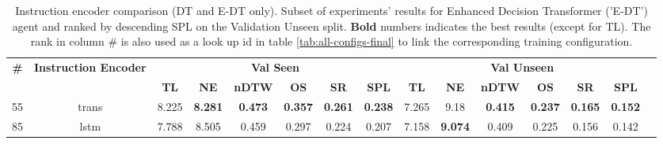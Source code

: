 \begin{table}
\centering
\caption{\label{tab:e_dt_instruction_encoding}Instruction encoder comparison (DT and E-DT only). Subset of experiments' results for Enhanced Decision Transformer ('E-DT') agent and ranked by descending SPL on the Validation Unseen split. \textbf{Bold} numbers indicates the best results (except for TL). The rank in column \# is also used as a look up id in table \ref{tab:all-configs-final} to link the corresponding training configuration.}
\begin{tabular}{@{\hskip3pt}c@{\hskip3pt}c@{\hskip3pt}c@{\hskip3pt}c@{\hskip3pt}c@{\hskip3pt}c@{\hskip3pt}c@{\hskip3pt}c@{\hskip3pt}c@{\hskip3pt}c@{\hskip3pt}c@{\hskip3pt}c@{\hskip3pt}c@{\hskip3pt}c@{\hskip3pt}c}
\toprule
                                  \textbf{\#} & \textbf{Instruction Encoder} & \multicolumn{6}{c}{\textbf{Val Seen}} & \multicolumn{6}{c}{\textbf{Val Unseen}} \\
\cmidrule(l){3-8}\cmidrule(l){9-14}\textbf{~} &                   \textbf{~} &       \textbf{TL} &     \textbf{NE} &   \textbf{nDTW} &     \textbf{OS} &     \textbf{SR} &    \textbf{SPL} &         \textbf{TL} &     \textbf{NE} &   \textbf{nDTW} &     \textbf{OS} &     \textbf{SR} &    \textbf{SPL} \\
\midrule
                                           55 &                        trans &             8.225 &  \textbf{8.281} &  \textbf{0.473} &  \textbf{0.357} &  \textbf{0.261} &  \textbf{0.238} &               7.265 &            9.18 &  \textbf{0.415} &  \textbf{0.237} &  \textbf{0.165} &  \textbf{0.152} \\
                                           85 &                         lstm &             7.788 &           8.505 &           0.459 &           0.297 &           0.224 &           0.207 &               7.158 &  \textbf{9.074} &           0.409 &           0.225 &           0.156 &           0.142 \\
\bottomrule
\end{tabular}
\end{table}

